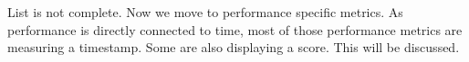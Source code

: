 















List is not complete.
Now we move to performance specific metrics.
As performance is directly connected to time, most of those performance metrics are measuring a timestamp.
Some are also displaying a score. 
This will be discussed.






 
 



